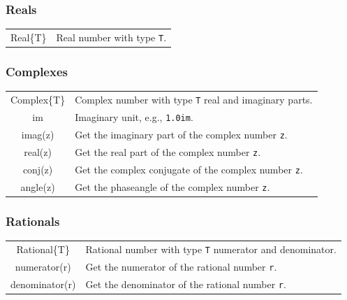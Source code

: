 \documentclass[5pt]{article}
\begin{document}
\begin{multicols}{2}
\subsubsection{Reals}
\begin{tabular}{C L}
    Real\{T\} & Real number with type \texttt{T}.\\
\end{tabular}

\subsubsection{Complexes}
\begin{tabular}{C L}
    Complex\{T\} & Complex number with type \texttt{T} real and imaginary parts.\\
    im & Imaginary unit, e.g., \texttt{1.0im}.\\
    imag(z) & Get the imaginary part of the complex number \texttt{z}.\\
    real(z) & Get the real part of the complex number \texttt{z}.\\
    conj(z) & Get the complex conjugate of the complex number \texttt{z}.\\
    angle(z) & Get the phaseangle of the complex number \texttt{z}.\\
\end{tabular}

\subsubsection{Rationals}
\begin{tabular}{C L}
    Rational\{T\} & Rational number with type \texttt{T} numerator and denominator.\\    
    numerator(r) & Get the numerator of the rational number \texttt{r}.\\
    denominator(r) & Get the denominator of the rational number \texttt{r}.\\
\end{tabular}


\end{multicols}
\end{document}
